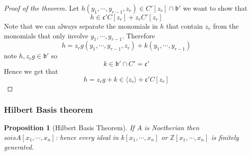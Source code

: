 \documentclass[11pt,a4paper]{article}
\theoremstyle{definition}
\theoremstyle{plain}
\newtheorem{proposition}[definition]{Proposition}
\theoremstyle{remark}
\newcommand{\Z}{\mathbb{Z}}
\newcommand{\angles}[1]{\langle #1 \rangle}
\begin{document}
\begin{proof}[Proof of the theorem]
    Let $h(y_1, \cdots, y_{r-1}, z_r) \in C'[z_r] \cap \mathfrak{b}'$ we want to show that 
    $$h \in \mathfrak{c}' C [z_r] + z_r C'[z_r]$$
    Note that we can always separate the monomials in $h$ that contain $z_r$ from the monomials that 
    only involve $y_1, \cdots, y_{r-1}$. Therefore 
    $$h = z_r g (y_1, \cdots, y_{r-1}, z_r) + k (y_1, \cdots, y_{r-1})$$
    note $h, z_r g \in \mathfrak{b}'$ so 
    $$k \in \mathfrak{b}' \cap C' = \mathfrak{c}'$$
    Hence we get that 
    $$h = z_r g + k \in \angles{z_r} + \mathfrak{c}' C[z_r]$$
\end{proof}

\subsubsection{Hilbert Basis theorem}
\begin{proposition}[Hilbert Basis Theorem]
    If $A$ is Noetherian then $so is A[x_1, \cdots, x_n]$: hence every ideal in 
    $k[x_1, \cdots, x_n]$ or $\Z[x_1, \cdots, x_n]$ is finitely generated.
\end{proposition}
\end{document}
